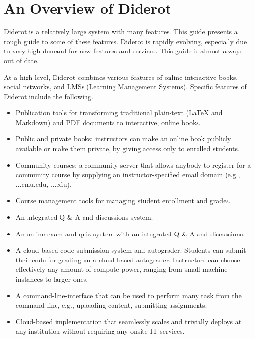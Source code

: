 \chapter{An Overview of Diderot}
\label{ch:overview}

\begin{gram}
\label{ch:overview::intro}
Diderot is a relatively large system with many features. This guide presents a rough guide to some of these features.  Diderot is rapidly evolving, especially due to very high demand for new features and services. This guide is almost always out of date.
\end{gram}

\begin{gram}
\label{ch:overview::features}
At a high level, Diderot combines various features of online interactive books,  social networks, and LMSs (Learning Management Systems).
% 
Specific features of Diderot include the following.

\begin{itemize}

\item  
\href{ch:dc}{Publication tools} 
%
for transforming traditional plain-text (LaTeX and Markdown) and PDF documents to interactive, online books. 

\item 
Public and private books: instructors can make an online book publicly
available or make them private, by giving access only to enrolled
students.

\item Community courses: a community server that allows anybody to register for a community course by supplying an instructor-specified email domain (e.g., \@...cmu.edu, \@...edu).
 
\item \href{ch:lms}{Course management tools} for managing student enrollment and grades.

\item An integrated Q \& A and discussions system. 

\item An \href{ch:quiz}{online exam and quiz system} with an integrated Q \& A and discussions.  

\item A cloud-based code submission system and autograder. Students
  can submit their code for grading on a cloud-based
  autograder. Instructors can choose effectively any amount of compute
  power, ranging from small machine instances to larger ones.

\item A \href{ch:cli}{command-line-interface} that can be used to
  perform many task from the command line, e.g., uploading content,
  submitting assignments.

\item
  Cloud-based implementation that seamlessly scales and trivially
  deploys at any institution without requiring any onsite IT services.
\end{itemize}
\end{gram}
